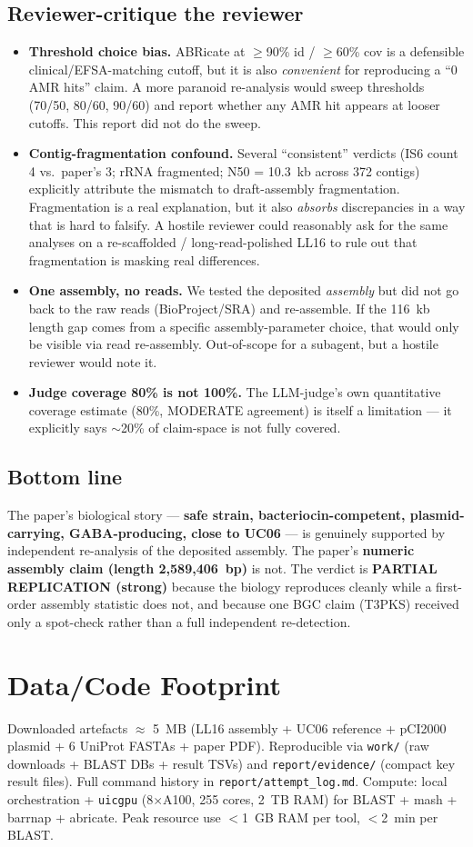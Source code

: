 \documentclass[11pt,a4paper]{article}
\begin{document}
\subsection{Reviewer-critique the reviewer}
\begin{itemize}
    \item \textbf{Threshold choice bias.} ABRicate at $\geq$90\% id / $\geq$60\% cov is a defensible clinical/EFSA-matching cutoff, but it is also \emph{convenient} for reproducing a ``0 AMR hits'' claim. A more paranoid re-analysis would sweep thresholds (70/50, 80/60, 90/60) and report whether any AMR hit appears at looser cutoffs. This report did not do the sweep.
    \item \textbf{Contig-fragmentation confound.} Several ``consistent'' verdicts (IS6 count 4 vs.\ paper's 3; rRNA fragmented; N50 = 10.3~kb across 372 contigs) explicitly attribute the mismatch to draft-assembly fragmentation. Fragmentation is a real explanation, but it also \emph{absorbs} discrepancies in a way that is hard to falsify. A hostile reviewer could reasonably ask for the same analyses on a re-scaffolded / long-read-polished LL16 to rule out that fragmentation is masking real differences.
    \item \textbf{One assembly, no reads.} We tested the deposited \emph{assembly} but did not go back to the raw reads (BioProject/SRA) and re-assemble. If the 116~kb length gap comes from a specific assembly-parameter choice, that would only be visible via read re-assembly. Out-of-scope for a subagent, but a hostile reviewer would note it.
    \item \textbf{Judge coverage 80\% is not 100\%.} The LLM-judge's own quantitative coverage estimate (80\%, MODERATE agreement) is itself a limitation --- it explicitly says $\sim$20\% of claim-space is not fully covered.
\end{itemize}

\subsection{Bottom line}
The paper's biological story --- \textbf{safe strain, bacteriocin-competent, plasmid-carrying, GABA-producing, close to UC06} --- is genuinely supported by independent re-analysis of the deposited assembly. The paper's \textbf{numeric assembly claim (length 2{,}589{,}406~bp)} is not. The verdict is \textbf{PARTIAL REPLICATION (strong)} because the biology reproduces cleanly while a first-order assembly statistic does not, and because one BGC claim (T3PKS) received only a spot-check rather than a full independent re-detection.

\section{Data/Code Footprint}
Downloaded artefacts $\approx$ 5~MB (LL16 assembly + UC06 reference + pCI2000 plasmid + 6 UniProt FASTAs + paper PDF). Reproducible via \texttt{work/} (raw downloads + BLAST DBs + result TSVs) and \texttt{report/evidence/} (compact key result files). Full command history in \texttt{report/attempt\_log.md}. Compute: local orchestration + \texttt{uicgpu} (8$\times$A100, 255 cores, 2~TB RAM) for BLAST + mash + barrnap + abricate. Peak resource use $<$1~GB RAM per tool, $<$2~min per BLAST.
\end{document}
